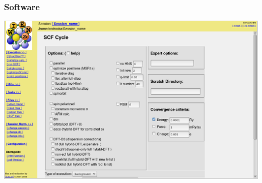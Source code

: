 \documentclass[noamsthm,8pt,t,xcolor={dvipsnames}]{beamer}
\begin{document}
\begin{frame}
   \frametitle{Software}
   \begin{center}
      \includegraphics[width=\linewidth]{figures/w2w.png}
   \end{center}
\end{frame}
\end{document}
